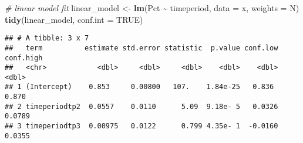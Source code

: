 \documentclass[
]{article}
\newenvironment{Shaded}{\begin{snugshade}}{\end{snugshade}}
\newcommand{\AttributeTok}[1]{\textcolor[rgb]{0.13,0.29,0.53}{#1}}
\newcommand{\CommentTok}[1]{\textcolor[rgb]{0.56,0.35,0.01}{\textit{#1}}}
\newcommand{\ConstantTok}[1]{\textcolor[rgb]{0.56,0.35,0.01}{#1}}
\newcommand{\FloatTok}[1]{\textcolor[rgb]{0.00,0.00,0.81}{#1}}
\newcommand{\FunctionTok}[1]{\textcolor[rgb]{0.13,0.29,0.53}{\textbf{#1}}}
\newcommand{\NormalTok}[1]{#1}
\newcommand{\OtherTok}[1]{\textcolor[rgb]{0.56,0.35,0.01}{#1}}
\newcommand{\SpecialCharTok}[1]{\textcolor[rgb]{0.81,0.36,0.00}{\textbf{#1}}}
\newcommand{\StringTok}[1]{\textcolor[rgb]{0.31,0.60,0.02}{#1}}
\begin{document}
\begin{Shaded}
\begin{Highlighting}[]
\CommentTok{\# linear model fit }
\NormalTok{linear\_model }\OtherTok{\textless{}{-}} \FunctionTok{lm}\NormalTok{(Pct }\SpecialCharTok{\textasciitilde{}}\NormalTok{ timeperiod, }\AttributeTok{data =}\NormalTok{ x, }\AttributeTok{weights =}\NormalTok{ N)}
\FunctionTok{tidy}\NormalTok{(linear\_model, }\AttributeTok{conf.int =} \ConstantTok{TRUE}\NormalTok{)}
\end{Highlighting}
\end{Shaded}

\begin{verbatim}
## # A tibble: 3 x 7
##   term          estimate std.error statistic  p.value conf.low conf.high
##   <chr>            <dbl>     <dbl>     <dbl>    <dbl>    <dbl>     <dbl>
## 1 (Intercept)    0.853     0.00800   107.    1.84e-25   0.836     0.870 
## 2 timeperiodtp2  0.0557    0.0110      5.09  9.18e- 5   0.0326    0.0789
## 3 timeperiodtp3  0.00975   0.0122      0.799 4.35e- 1  -0.0160    0.0355
\end{verbatim}

\begin{Shaded}
\end{Shaded}
\end{document}

